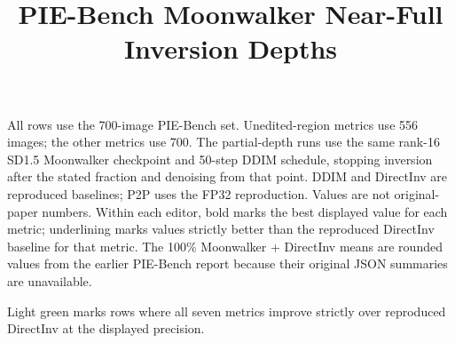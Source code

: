 \documentclass[10pt]{article}
\title{PIE-Bench Moonwalker Near-Full Inversion Depths}
\date{}
\begin{document}
\maketitle
\noindent All rows use the 700-image PIE-Bench set. Unedited-region metrics use 556 images; the other metrics use 700. The partial-depth runs use the same rank-16 SD1.5 Moonwalker checkpoint and 50-step DDIM schedule, stopping inversion after the stated fraction and denoising from that point. DDIM and DirectInv are reproduced baselines; P2P uses the FP32 reproduction. Values are not original-paper numbers. Within each editor, bold marks the best displayed value for each metric; underlining marks values strictly better than the reproduced DirectInv baseline for that metric. The 100\% Moonwalker + DirectInv means are rounded values from the earlier PIE-Bench report because their original JSON summaries are unavailable.
\par\noindent Light green marks rows where all seven metrics improve strictly over reproduced DirectInv at the displayed precision.
\par\medskip
\end{document}

